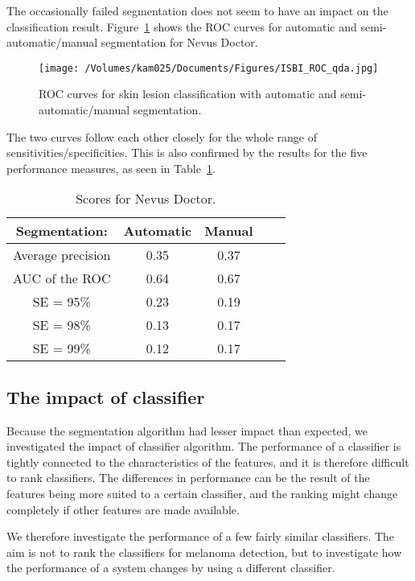 \documentclass[a4paper,12pt]{article}
\begin{document}
The occasionally failed segmentation does not seem to have an impact on the classification result.
Figure~\ref{fig:ROC} shows the ROC curves for automatic and semi-automatic/manual segmentation for Nevus Doctor. 
  \begin{figure}[h!]
     \texttt{[image: /Volumes/kam025/Documents/Figures/ISBI\_ROC\_qda.jpg]}
      \caption{ROC curves for skin lesion classification with automatic and semi-automatic/manual segmentation.}
       \label{fig:ROC}
   \end{figure}
The two curves follow each other closely for the whole range of sensitivities/specificities. 
This is also confirmed by the results for the five performance measures, as seen in Table~\ref{tab:ND_Rankings}.    
\begin{table}[h!]
\begin{tabular}{c | c | c | c | c}
        Segmentation: &{Automatic} & {Manual} \\
        \hline
  Average precision & 0.35 & 0.37 \\
  AUC of the ROC & 0.64 & 0.67 \\
  SE = 95\% & 0.23 & 0.19 \\
  SE = 98\%  & 0.13 & 0.17 \\
  SE = 99\%  & 0.12  & 0.17
\end{tabular}
  \caption{Scores for Nevus Doctor.}
  \label{tab:ND_Rankings}
\end{table}

\subsection{The impact of classifier} 

Because the segmentation algorithm had lesser impact than expected, we investigated the impact of classifier algorithm.
The performance of a classifier is tightly connected to the characteristics of the features, and it is therefore difficult to rank classifiers.
The differences in performance can be the result of the features being more suited to a certain classifier, and the ranking might change completely if other features are made available. 

 We therefore investigate the performance of a few fairly similar classifiers. 
 The aim is not to rank the classifiers for melanoma detection, but to investigate how the performance of a system changes by using a different classifier. 
\end{document}
